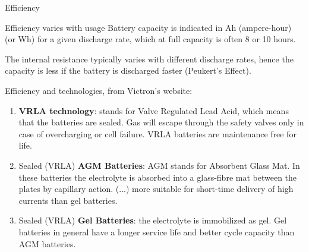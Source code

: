 \begin{frame}{Efficiency}
\end{frame}\begin{frame}{Efficiency varies with usage}
Battery capacity is indicated in Ah (ampere-hour) (or Wh) for a given discharge rate, which at full capacity is often 8 or 10 hours.

The internal resistance typically varies with different discharge rates, hence the capacity is less if the battery is discharged faster (Peukert’s Effect).

\end{frame}

\begin{frame}[allowframebreaks]{Efficiency and technologies, from Victron's website:}
\begin{enumerate}
  \item \textbf{VRLA technology}: stands for Valve Regulated Lead Acid, which means that the batteries are sealed. Gas will escape through the safety valves only in case of overcharging or cell failure. VRLA batteries are maintenance free for life.
  \item Sealed (VRLA) \textbf{AGM Batteries}: AGM stands for Absorbent Glass Mat. In these batteries the electrolyte is absorbed into a glass-fibre mat between the plates by capillary action. (...) more suitable for short-time delivery of high currents than gel batteries.
  \item Sealed (VRLA) \textbf{Gel Batteries}: the electrolyte is immobilized as gel. Gel batteries in general have a longer service life and better cycle capacity than AGM batteries.
\end{enumerate}



\end{frame}
